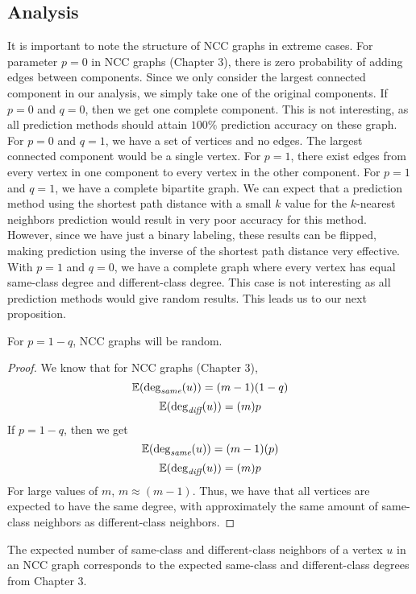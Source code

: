\subsection{Analysis}
It is important to note the structure of NCC graphs in extreme cases.
For parameter $p=0$ in NCC graphs (Chapter 3), there is zero probability
of adding edges between components. Since we only consider the largest 
connected component in our analysis, we simply take one of the original components. 
If $p=0$ and $q=0$, then we get one complete component. This is not 
interesting, as all prediction methods should attain $100\%$ prediction 
accuracy on these graph. For $p=0$ and $q=1$, we have a set of vertices and no edges. The largest 
connected component would be a single vertex. For $p=1$, there exist edges
from every vertex in one component to every vertex in the other component.
For $p=1$ and $q=1$, we have a complete bipartite graph. We can expect that
a prediction method using the shortest path distance with a small $k$ value
for the $k$-nearest neighbors prediction would result in very poor accuracy
for this method. However, since we have just a binary labeling, these
results can be flipped, making prediction using the inverse of the shortest 
path distance very effective.
With $p=1$ and $q=0$, we have a complete graph where every vertex has equal
same-class degree and different-class degree. This case is not interesting
as all prediction methods would give random results. This leads us to our
next proposition.

\begin{proposition}
For $p = 1 - q$, NCC graphs will be random.
\end{proposition}
\begin{proof}
We know that for NCC graphs (Chapter 3),
$$\mathbb{E}(\deg_{\textit{same}}(u)) = (m-1)(1-q)$$
$$\mathbb{E}(\deg_{\textit{diff}}(u)) = (m)p$$
If $p=1-q$, then we get
$$\mathbb{E}(\deg_{\textit{same}}(u)) = (m-1)(p)$$
$$\mathbb{E}(\deg_{\textit{diff}}(u)) = (m)p$$
For large values of $m$, $m \approx (m-1)$. Thus, we have that all vertices
are expected to have the same degree, with approximately the same amount
of same-class neighbors as different-class neighbors.
\end{proof}

\begin{proposition}
The expected number of same-class and different-class neighbors of a vertex
$u$ in an NCC graph corresponds to the expected same-class and 
different-class degrees from Chapter 3.
\end{proposition}

